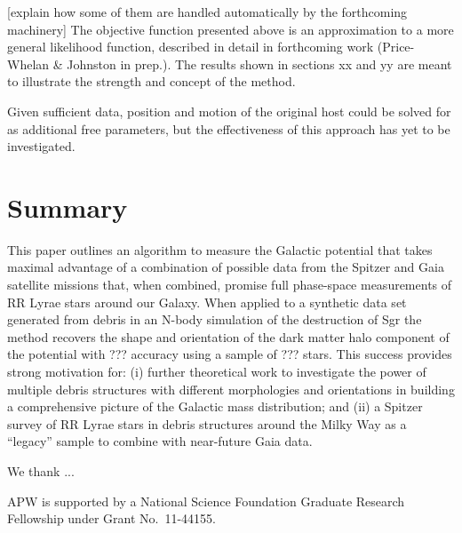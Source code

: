 \documentclass[preprint]{aastex}
\begin{document}
[explain how some of them are handled automatically by the forthcoming machinery]
The objective function presented above is an approximation to a more general likelihood function, described in detail in forthcoming work (Price-Whelan \& Johnston in prep.). The results shown in sections xx and yy are meant to illustrate the strength and concept of the method.

Given sufficient data, position and motion of the original host could be solved for as additional free parameters,
but the effectiveness of this approach has yet to be investigated.

\section{Summary}

This paper outlines an algorithm to measure the Galactic potential that takes maximal advantage of a combination of possible data from the Spitzer and Gaia satellite
missions that, when combined,  promise full phase-space measurements of RR Lyrae stars around our Galaxy.
When applied to a synthetic data set generated from debris in an N-body simulation of the destruction of Sgr the method recovers the shape and orientation of the dark
matter halo component of the potential with ??? accuracy using a sample of ??? stars.
This success provides strong motivation for: (i) further theoretical work to investigate the power of multiple debris structures with different morphologies and orientations in
building a comprehensive picture of the Galactic mass distribution; and (ii) a  Spitzer survey of RR Lyrae stars in debris structures around the Milky Way as a ``legacy''
sample to combine with near-future Gaia data.

\acknowledgments
We thank ...

APW is supported by a National Science Foundation Graduate Research Fellowship under Grant No.\ 11-44155.



\end{document}
